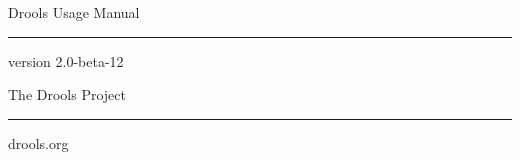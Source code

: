 \documentclass[10pt,oneside,letterpaper,colorhighlight]{book}
\begin{document}
\frontmatter

\begin{titlepage}
\selectfont
\rule{0pt}{3in}


\noindent
{\Huge Drools Usage Manual}\\
\rule{\textwidth}{1pt}

\vspace{8pt}
\noindent
{}\selectfont
{\large version \Large2.0-beta-12}\\
{\small{\color{light}{generated \today}}}

\vspace{2in}
\begin{flushright}
\selectfont
\noindent
{\Large The Drools Project}\\
\rule{2in}{0.5pt}

\vspace{6pt}
{\Large drools.org}
\end{flushright}
\end{titlepage} 

\pagestyle{empty}
\tableofcontents
\listoffigures

\pagestyle{fancy}
\mainmatter

%













\appendix







{\small
\pagestyle{plain}
\printindex
}


\end{document}
